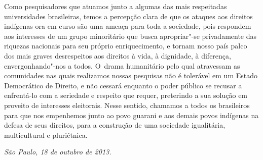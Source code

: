 Como pesquisadores que atuamos junto a algumas das mais respeitadas
universidades brasileiras, temos a percepção clara de que os ataques
aos direitos indígenas ora em curso são uma ameaça para toda a
sociedade, pois respondem aos interesses de um grupo minoritário que
busca apropriar"-se privadamente das riquezas nacionais para seu próprio
enriquecimento, e tornam nosso país palco dos mais graves desrespeitos
aos direitos à vida, à dignidade, à diferença, envergonhando"-nos a
todos. O~drama humanitário pelo qual atravessam as comunidades nas
quais realizamos nossas pesquisas não é tolerável em um Estado
Democrático de Direito, e não cessará enquanto o poder público se
recusar a enfrentá-lo com a seriedade e respeito que requer, preterindo
a sua solução em proveito de interesses eleitorais. Nesse sentido,
chamamos a todos os brasileiros para que nos empenhemos junto ao povo
guarani e aos demais povos indígenas na defesa de seus direitos, para a
construção de uma sociedade igualitária, multicultural e pluriétnica.

\begin{flushright}
\emph{São Paulo, 18 de outubro de 2013.}
\end{flushright}
